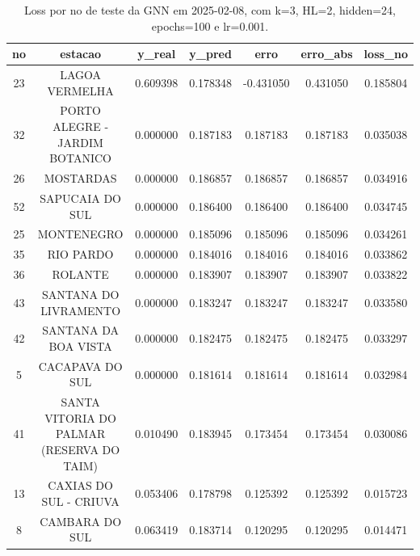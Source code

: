 \begin{table}[h]
\centering
\caption{Loss por no de teste da GNN em 2025-02-08, com k=3, HL=2, hidden=24, epochs=100 e lr=0.001.}
\label{tab:gnn_loss_k3_hl2_h24_e100_d20250208}
\begin{tabular}{ccccccc}
\toprule
no & estacao & y\_real & y\_pred & erro & erro\_abs & loss\_no \\
\midrule
23 & LAGOA VERMELHA & 0.609398 & 0.178348 & -0.431050 & 0.431050 & 0.185804 \\
32 & PORTO ALEGRE - JARDIM BOTANICO & 0.000000 & 0.187183 & 0.187183 & 0.187183 & 0.035038 \\
26 & MOSTARDAS & 0.000000 & 0.186857 & 0.186857 & 0.186857 & 0.034916 \\
52 & SAPUCAIA DO SUL & 0.000000 & 0.186400 & 0.186400 & 0.186400 & 0.034745 \\
25 & MONTENEGRO & 0.000000 & 0.185096 & 0.185096 & 0.185096 & 0.034261 \\
35 & RIO PARDO & 0.000000 & 0.184016 & 0.184016 & 0.184016 & 0.033862 \\
36 & ROLANTE & 0.000000 & 0.183907 & 0.183907 & 0.183907 & 0.033822 \\
43 & SANTANA DO LIVRAMENTO & 0.000000 & 0.183247 & 0.183247 & 0.183247 & 0.033580 \\
42 & SANTANA DA BOA VISTA & 0.000000 & 0.182475 & 0.182475 & 0.182475 & 0.033297 \\
5 & CACAPAVA DO SUL & 0.000000 & 0.181614 & 0.181614 & 0.181614 & 0.032984 \\
41 & SANTA VITORIA DO PALMAR (RESERVA DO TAIM) & 0.010490 & 0.183945 & 0.173454 & 0.173454 & 0.030086 \\
13 & CAXIAS DO SUL - CRIUVA & 0.053406 & 0.178798 & 0.125392 & 0.125392 & 0.015723 \\
8 & CAMBARA DO SUL & 0.063419 & 0.183714 & 0.120295 & 0.120295 & 0.014471 \\
\bottomrule
\end{tabular}
\end{table}
